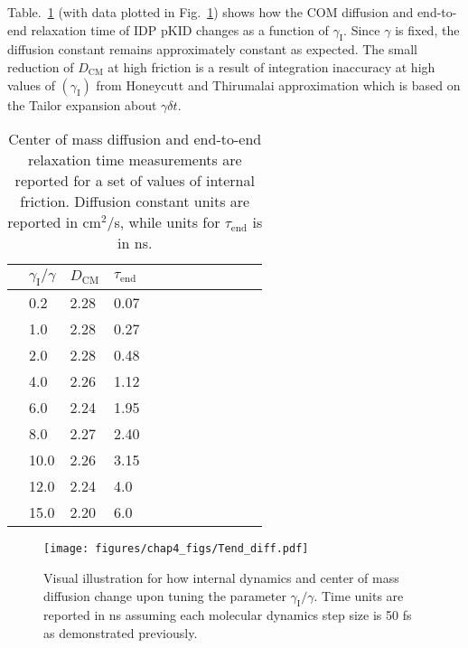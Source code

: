 \documentclass[../talant.diss.submit.tex]{subfiles}
\begin{document}
Table.~\ref{tab:diff_tab} (with data plotted in Fig.~\ref{fig:Tend_diff}) shows how the COM diffusion
and end-to-end relaxation time
of IDP pKID changes as a function of $\gamma_{\mathrm{I}}$.
Since $\gamma$ is fixed, the diffusion constant remains approximately constant as expected.
The small
reduction of $D_\mathrm{CM}$ at high friction is a result of integration inaccuracy at high values
of $(\gamma_{\mathrm{I}})$ from
Honeycutt and Thirumalai approximation which is based on the Tailor expansion
about $\gamma \delta t$.
%
%
%
\begin{table}[htp!]
  \centering
  \begin{tabular}{@{}llllllllllll@{}}
    & $\gamma_{\mathrm{I}} / \gamma$
    & $D_{\mathrm{CM}}$ 
    & $\tau_{\mathrm{end}}$\\
    \hline 
    & 0.2    & 2.28  &  0.07  \\
    & 1.0    & 2.28  &  0.27  \\
    & 2.0    & 2.28  &  0.48  \\
    & 4.0    & 2.26  &  1.12  \\
    & 6.0    & 2.24  &  1.95  \\
    & 8.0    & 2.27  &  2.40  \\
    & 10.0   & 2.26  &  3.15  \\
    & 12.0   & 2.24  &  4.0   \\
    & 15.0   & 2.20  &  6.0   \\
  \end{tabular}
  \caption{Center of mass diffusion and end-to-end relaxation time measurements
    are reported for a set of values of internal friction. Diffusion constant units are reported
    in $\mathrm{cm^2}$/s, while units for $\tau_{\mathrm{end}}$ is in ns.}
  \label{tab:diff_tab}
\end{table}
%
%


\begin{figure}[htp!]                                                                                          
  \begin{centering}                                                                                         
    \texttt{[image: figures/chap4\_figs/Tend\_diff.pdf]}
    \caption{Visual illustration for how internal dynamics and center of mass diffusion
      change upon tuning the parameter $\gamma_{\mathrm{I}}/\gamma$. Time units are reported
      in ns assuming each molecular dynamics step size is 50 fs as demonstrated previously.}                    
    \label{fig:Tend_diff}                                                                                 
  \end{centering}                                                                                           
\end{figure}                                                                                             
\end{document}

